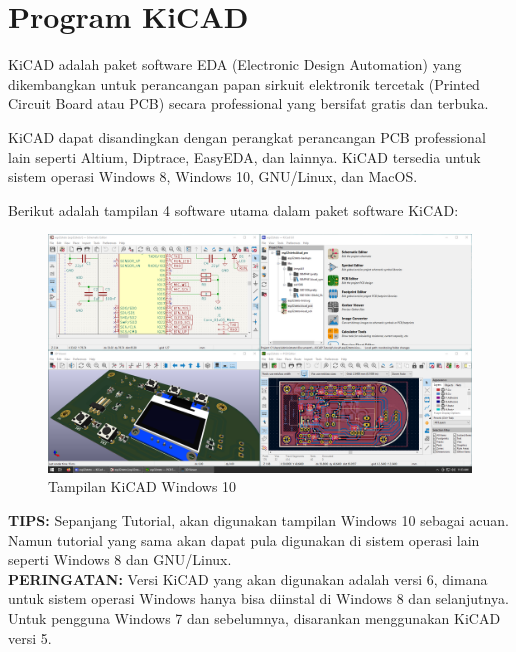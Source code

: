 \documentclass[12pt]{book}
\begin{document}
	
	\newpage
	\mainmatter
	\chapter{Program KiCAD}
	
	KiCAD adalah paket software EDA (Electronic Design Automation) yang dikembangkan untuk perancangan papan sirkuit elektronik tercetak (Printed Circuit Board atau PCB) 
	secara professional yang bersifat gratis dan terbuka.
	
	KiCAD dapat disandingkan dengan perangkat perancangan PCB professional lain seperti Altium, Diptrace, EasyEDA, dan lainnya.
	KiCAD tersedia untuk sistem operasi Windows 8, Windows 10, GNU/Linux, dan MacOS.
	
	Berikut adalah tampilan 4 software utama dalam paket software KiCAD:
	\begin{figure}[!ht]
		\centering
		\includegraphics[width=\textwidth]{images/kicad_windows10}
		\caption{Tampilan KiCAD Windows 10}
	\end{figure}

	\textbf{TIPS:} Sepanjang Tutorial, akan digunakan tampilan Windows 10 sebagai acuan.
	Namun tutorial yang sama akan dapat pula digunakan di sistem operasi lain seperti Windows 8 dan GNU/Linux.\\
	
	\textbf{PERINGATAN:} Versi KiCAD yang akan digunakan adalah versi 6, dimana untuk sistem operasi Windows
	hanya bisa diinstal di Windows 8 dan selanjutnya.
	Untuk pengguna Windows 7 dan sebelumnya, disarankan menggunakan KiCAD versi 5. 
\end{document}
